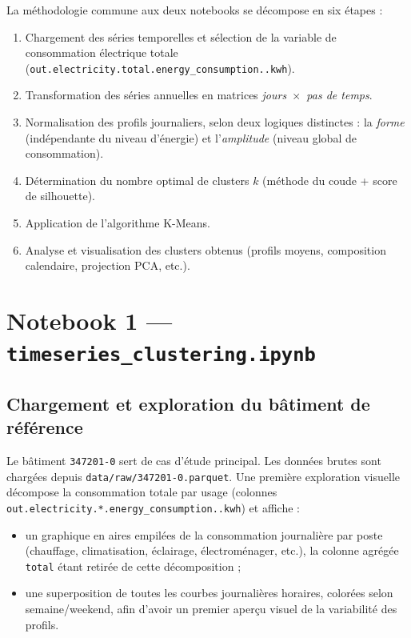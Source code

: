 \documentclass[11pt,a4paper]{article}
\newcommand{\code}[1]{\texttt{#1}}
\begin{document}
La méthodologie commune aux deux notebooks se décompose en six étapes :

\begin{enumerate}
    \item Chargement des séries temporelles et sélection de la variable de consommation
    électrique totale (\code{out.electricity.total.energy\_consumption..kwh}).
    \item Transformation des séries annuelles en matrices \emph{jours~$\times$~pas de temps}.
    \item Normalisation des profils journaliers, selon deux logiques distinctes : la
    \emph{forme} (indépendante du niveau d'énergie) et l'\emph{amplitude} (niveau global de
    consommation).
    \item Détermination du nombre optimal de clusters $k$ (méthode du coude + score de
    silhouette).
    \item Application de l'algorithme K-Means.
    \item Analyse et visualisation des clusters obtenus (profils moyens, composition
    calendaire, projection PCA, etc.).
\end{enumerate}

\section{Notebook 1 --- \code{timeseries\_clustering.ipynb}}

\subsection{Chargement et exploration du bâtiment de référence}

Le bâtiment \code{347201-0} sert de cas d'étude principal. Les données brutes sont chargées
depuis \code{data/raw/347201-0.parquet}. Une première exploration visuelle décompose la
consommation totale par usage (colonnes \code{out.electricity.*.energy\_consumption..kwh}) et
affiche :

\begin{itemize}
    \item un graphique en aires empilées de la consommation journalière par poste
    (chauffage, climatisation, éclairage, électroménager, etc.), la colonne agrégée \code{total}
    étant retirée de cette décomposition ;
    \item une superposition de toutes les courbes journalières horaires, colorées selon
    semaine/weekend, afin d'avoir un premier aperçu visuel de la variabilité des profils.
\end{itemize}
\end{document}
